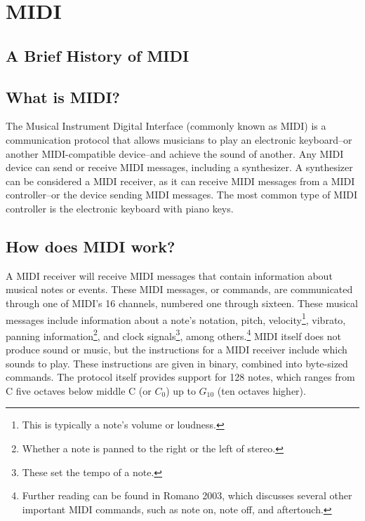 \section[MIDI: An Introduction]{MIDI}\label{midi}

\subsection[MIDI's History]{A Brief History of MIDI}\label{midi-history}


\subsection[What is MIDI?]{What is MIDI?}\label{what-midi}

The Musical Instrument Digital Interface (commonly known as MIDI) is a communication protocol that allows musicians to play an electronic keyboard--or another MIDI-compatible device--and achieve the sound of another. Any MIDI device can send or receive MIDI messages, including a synthesizer. A synthesizer can be considered a MIDI receiver, as it can receive MIDI messages from a MIDI controller--or the device sending MIDI messages. The most common type of MIDI controller is the electronic keyboard with piano keys.

\subsection[How does MIDI work?]{How does MIDI work?}\label{how-midi}

A MIDI receiver will receive MIDI messages that contain information about musical notes or events. These MIDI messages, or commands, are communicated through one of MIDI's 16 channels, numbered one through sixteen. These musical messages include information about a note's notation, pitch, velocity\footnote{This is typically a note's volume or loudness.}, vibrato, panning information\footnote{Whether a note is panned to the right or the left of stereo.}, and clock signals\footnote{These set the tempo of a note.}, among others.\footnote{Further reading can be found in Romano 2003, which discusses several other important MIDI commands, such as note on, note off, and aftertouch.} MIDI itself does not produce sound or music, but the instructions for a MIDI receiver include which sounds to play. These instructions are given in binary, combined into byte-sized commands. The protocol itself provides support for 128 notes, which ranges from C five octaves below middle C (or $C_0$) up to $G_{10}$ (ten octaves higher).